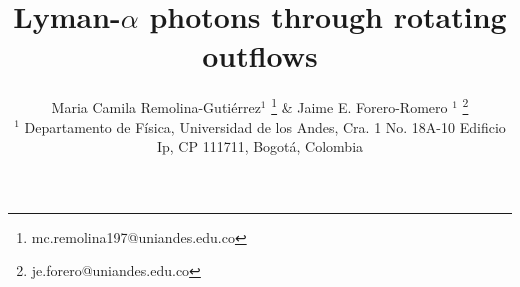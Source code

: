 \documentclass[a4paper,fleqn,usenatbib]{mnras}
\providecommand{\DIFaddbegin}{} %
\providecommand{\DIFaddend}{} %
\providecommand{\DIFdelbegin}{} %
\providecommand{\DIFdelend}{} %
\newcommand{\DIFscaledelfig}{0.5}
\newlength{\DIFdelgraphicswidth} %
\newlength{\DIFdelgraphicsheight} %
\newcommand{\DIFaddincludegraphics}[2][]{{\color{blue}\fbox{\DIFOincludegraphics[#1]{#2}}}} %
\newcommand{\DIFdelincludegraphics}[2][]{%
\sbox{\DIFdelgraphicsbox}{\DIFOincludegraphics[#1]{#2}}%
\settoboxwidth{\DIFdelgraphicswidth}{\DIFdelgraphicsbox} %
\settoboxtotalheight{\DIFdelgraphicsheight}{\DIFdelgraphicsbox} %
\scalebox{\DIFscaledelfig}{%
\parbox[b]{\DIFdelgraphicswidth}{\usebox{\DIFdelgraphicsbox}\\[-\baselineskip] \rule{\DIFdelgraphicswidth}{0em}}\llap{\resizebox{\DIFdelgraphicswidth}{\DIFdelgraphicsheight}{%
\setlength{\unitlength}{\DIFdelgraphicswidth}%
\begin{picture}(1,1)%
\thicklines\linethickness{2pt} %
{\color[rgb]{1,0,0}\put(0,0){\framebox(1,1){}}}%
{\color[rgb]{1,0,0}\put(0,0){\line( 1,1){1}}}%
{\color[rgb]{1,0,0}\put(0,1){\line(1,-1){1}}}%
\end{picture}%
}\hspace*{3pt}}} %
} %
\DeclareRobustCommand{\DIFaddbegin}{\DIFOaddbegin \let\includegraphics\DIFaddincludegraphics} %
\DeclareRobustCommand{\DIFaddend}{\DIFOaddend \let\includegraphics\DIFOincludegraphics} %
\DeclareRobustCommand{\DIFdelbegin}{\DIFOdelbegin \let\includegraphics\DIFdelincludegraphics} %
\DeclareRobustCommand{\DIFdelend}{\DIFOaddend \let\includegraphics\DIFOincludegraphics} %
\begin{document}
\DIFdelbegin %
\DIFdelend \DIFaddbegin \title[Lyman-$\alpha$ photons through rotating
  outflows]{\DIFaddend Lyman-$\alpha$ photons through rotating outflows}  
\author[M.C. Remolina-Gutierrez \& J.E. Forero-Romero]{
  Maria Camila Remolina-Guti\'errez$^{1}$
  \thanks{mc.remolina197@uniandes.edu.co} \&
  Jaime E. Forero-Romero $^{1}$
  \thanks{je.forero@uniandes.edu.co}\\
  $^{1}$ Departamento de F\'isica, Universidad de los Andes, Cra. 1
  No. 18A-10 Edificio Ip, CP 111711, Bogot\'a, Colombia \\
}

\maketitle
\end{document}
